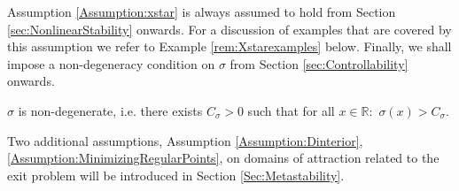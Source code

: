 \documentclass[10pt, reqno]{amsart}
\newcommand{\R}{\mathbb{R}}
\newenvironment{customthm}[1]
{\renewcommand\theinnercustomthm{#1}\innercustomthm}
{\endinnercustomthm}
\theoremstyle{definition}
\numberwithin{lem}{section}
\numberwithin{cor}{section}
\numberwithin{prop}{section}
\numberwithin{thm}{section}
\numberwithin{dfn}{section}
\begin{document}
   
   Assumption \ref{Assumption:xstar} is always assumed to hold from Section \ref{sec:NonlinearStability} onwards. For a discussion of examples that are covered by this assumption we refer to Example \ref{rem:Xstarexamples} below. Finally, we shall impose a non-degeneracy condition on $\sigma$ from Section \ref{sec:Controllability} onwards.

   \begin{customthm}{4}\label{Assumption:sigmaNondeg} $\sigma$ is non-degenerate, i.e. there exists $C_\sigma>0$ such that for all $x\in\R:$ $\sigma(x)>C_\sigma.$
   \end{customthm}


     Two additional assumptions, Assumption \ref{Assumption:Dinterior}, \ref{Assumption:MinimizingRegularPoints}, on domains of attraction related to the exit problem will be introduced in Section \ref{Sec:Metastability}. 
    
        

 
 

 








 
\end{document}
